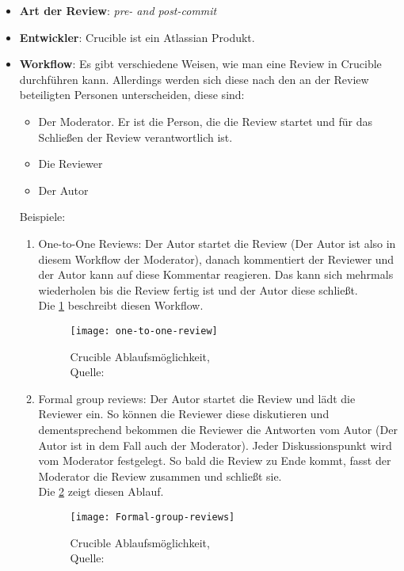 \begin{itemize}
	\item \textbf{Art der Review}: \textit{pre- and post-commit}
	\item \textbf{Entwickler}: Crucible ist ein Atlassian Produkt.
	\item \textbf{Workflow}: Es gibt verschiedene Weisen, wie man eine Review in Crucible durchführen kann. Allerdings werden sich diese nach den an der Review beteiligten Personen
		 unterscheiden, diese sind:
		\begin{itemize}
			\item Der Moderator. Er ist die Person, die die Review startet und für das Schließen der Review verantwortlich ist.
			\item Die Reviewer
			\item Der Autor
		\end{itemize}
		Beispiele:
		
		\begin{enumerate}
			\item One-to-One Reviews: Der Autor startet die Review (Der Autor ist also in diesem Workflow der Moderator), danach kommentiert der Reviewer und der Autor kann auf diese
				Kommentar reagieren. Das kann sich mehrmals wiederholen bis die Review fertig ist und der Autor diese schließt.\\
				Die \cref{fig:one-to-one-workflow} beschreibt diesen Workflow.
				\begin{figure}[H]
					\centering
					\texttt{[image: one-to-one-review]}
					\caption[Crucible: one-to-one-review]{Crucible Ablaufsmöglichkeit,\\ Quelle: \cite{Crucible}}
					\label{fig:one-to-one-workflow}
				\end{figure}
				
			\item Formal group reviews: Der Autor startet die Review und lädt die Reviewer ein. So können die Reviewer diese diskutieren und dementsprechend bekommen die Reviewer 
				die Antworten vom Autor (Der Autor ist in dem Fall auch der Moderator). Jeder Diskussionspunkt wird vom Moderator festgelegt. So bald die Review zu Ende kommt,
				fasst der Moderator die Review zusammen und schließt sie.\\
				Die \cref{fig:Formal-group-review} zeigt diesen Ablauf.
				\begin{figure}[H]
					\centering
					\texttt{[image: Formal-group-reviews]}
					\caption[Crucible: Formal group review]{Crucible Ablaufsmöglichkeit,\\ Quelle:\cite{Crucible}}
					\label{fig:Formal-group-review}
				\end{figure}
		\end{enumerate}
		
\end{itemize}

